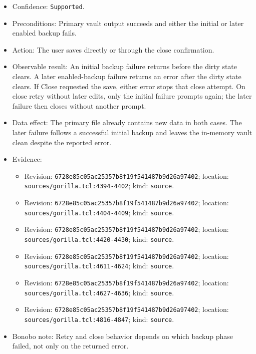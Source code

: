 \documentclass[
  letterpaper,
]{article}
\newcommand{\passthrough}[1]{#1}
\providecommand{\tightlist}{%
  \setlength{\itemsep}{0pt}\setlength{\parskip}{0pt}}
\begin{document}
\begin{itemize}
\tightlist
\item
  Confidence: \passthrough{\lstinline!Supported!}.
\item
  Preconditions: Primary vault output succeeds and either the initial or later enabled backup fails.
\item
  Action: The user saves directly or through the close confirmation.
\item
  Observable result: An initial backup failure returns before the dirty state clears. A later enabled-backup failure
  returns an error after the dirty state clears. If Close requested the save, either error stops that close attempt. On
  close retry without later edits, only the initial failure prompts again; the later failure then closes without another
  prompt.
\item
  Data effect: The primary file already contains new data in both cases. The later failure follows a successful initial
  backup and leaves the in-memory vault clean despite the reported error.
\item
  Evidence:

  \begin{itemize}
  \tightlist
  \item
    Revision: \nolinkurl{6728e85c05ac25357b8f19f541487b9d26a97402}; location: \nolinkurl{sources/gorilla.tcl:4394-4402};
    kind: \passthrough{\lstinline!source!}.
  \item
    Revision: \nolinkurl{6728e85c05ac25357b8f19f541487b9d26a97402}; location: \nolinkurl{sources/gorilla.tcl:4404-4409};
    kind: \passthrough{\lstinline!source!}.
  \item
    Revision: \nolinkurl{6728e85c05ac25357b8f19f541487b9d26a97402}; location: \nolinkurl{sources/gorilla.tcl:4420-4430};
    kind: \passthrough{\lstinline!source!}.
  \item
    Revision: \nolinkurl{6728e85c05ac25357b8f19f541487b9d26a97402}; location: \nolinkurl{sources/gorilla.tcl:4611-4624};
    kind: \passthrough{\lstinline!source!}.
  \item
    Revision: \nolinkurl{6728e85c05ac25357b8f19f541487b9d26a97402}; location: \nolinkurl{sources/gorilla.tcl:4627-4636};
    kind: \passthrough{\lstinline!source!}.
  \item
    Revision: \nolinkurl{6728e85c05ac25357b8f19f541487b9d26a97402}; location: \nolinkurl{sources/gorilla.tcl:4816-4847};
    kind: \passthrough{\lstinline!source!}.
  \end{itemize}
\item
  Bonobo note: Retry and close behavior depends on which backup phase failed, not only on the returned error.
\end{itemize}
\end{document}
